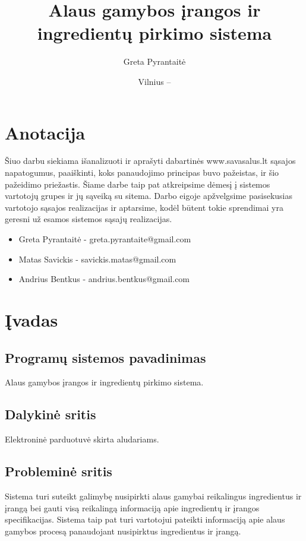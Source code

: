 \documentclass[oneside]{VUMIFPSkursinis}
\title{Alaus gamybos įrangos ir ingredientų pirkimo sistema}
\author{Greta Pyrantaitė}
\date{Vilnius – \the\year}
\begin{document}
\maketitle

\section{Anotacija}
Šiuo darbu siekiama išanalizuoti ir aprašyti dabartinės www.savasalus.lt sąsajos napatogumus, paaiškinti, koks panaudojimo principas buvo pažeistas, ir šio pažeidimo priežastis.
Šiame darbe taip pat atkreipsime dėmesį į sistemos vartotojų grupes ir jų sąveiką su sitema.
Darbo eigoje apžvelgsime pasisekusias vartotojo sąsajos realizacijas ir aptarsime, kodėl būtent tokie sprendimai yra geresni už esamos sistemos sąsajų realizacijas.

\begin{itemize}
	\item{Greta Pyrantaitė - greta.pyrantaite@gmail.com}
	\item{Matas Savickis - savickis.matas@gmail.com}
	\item{Andrius Bentkus - andrius.bentkus@gmail.com}
\end{itemize}

\tableofcontents

\section{Įvadas}
	\subsection{Programų sistemos pavadinimas}
		Alaus gamybos įrangos ir ingredientų pirkimo sistema.
	\subsection{Dalykinė sritis}
		Elektroninė parduotuvė skirta aludariams.
	\subsection{Probleminė sritis}
		Sistema turi suteikt galimybę nusipirkti alaus gamybai reikalingus ingredientus ir įrangą bei gauti visą reikalingą informaciją apie ingredientų ir įrangos specifikacijas.
		Sistema taip pat turi vartotojui pateikti informaciją apie alaus gamybos procesą panaudojant nusipirktus ingredientus ir įrangą.
\end{document}
